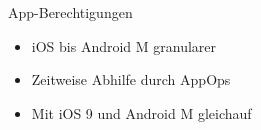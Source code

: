 \begin{frame}

	\begin{block}{}
		App-Berechtigungen
	\end{block}
	
	\begin{itemize}
	  \item iOS bis Android M granularer
	  \item Zeitweise Abhilfe durch AppOps
	  \item Mit iOS 9 und Android M gleichauf
	\end{itemize}

\end{frame}
